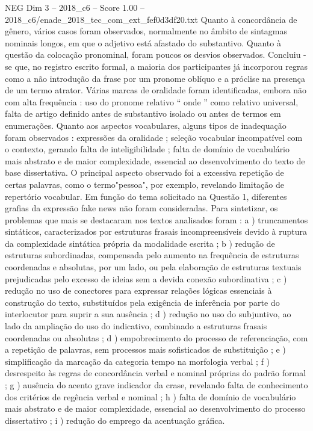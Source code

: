 \begin{textsample}{NEG Dim 3 – 2018\_c6 – Score 1.00 – 2018\_c6/enade\_2018\_tec\_com\_ext\_fef0d3df20.txt}
Quanto à concordância de gênero, vários casos foram observados, normalmente no âmbito de sintagmas nominais longos, em que o adjetivo está afastado do substantivo.
Quanto à questão da colocação pronominal, foram poucos os desvios observados.
Concluiu -se que, no registro escrito formal, a maioria dos participantes já incorporou regras como a não introdução da frase por um pronome oblíquo e a próclise na presença de um termo atrator.
Várias marcas de oralidade foram identificadas, embora não com alta frequência : uso do pronome relativo “ onde ” como relativo universal, falta de artigo definido antes de substantivo isolado ou antes de termos em enumerações.
Quanto aos aspectos vocabulares, alguns tipos de inadequação foram observados : expressões da oralidade ; seleção vocabular incompatível com o contexto, gerando falta de inteligibilidade ; falta de domínio de vocabulário mais abstrato e de maior complexidade, essencial ao desenvolvimento do texto de base dissertativa.
O principal aspecto observado foi a excessiva repetição de certas palavras, como o termo"pessoa", por exemplo, revelando limitação de repertório vocabular.
Em função do tema solicitado na Questão 1, diferentes grafias da expressão fake news não foram consideradas.
Para sintetizar, os problemas que mais se destacaram nos textos analisados foram : a ) truncamentos sintáticos, caracterizados por estruturas frasais incompreensíveis devido à ruptura da complexidade sintática própria da modalidade escrita ; b ) redução de estruturas subordinadas, compensada pelo aumento na frequência de estruturas coordenadas e absolutas, por um lado, ou pela elaboração de estruturas textuais prejudicadas pelo excesso de ideias sem a devida conexão subordinativa ; c ) redução no uso de conectores para expressar relações lógicas essenciais à construção do texto, substituídos pela exigência de inferência por parte do interlocutor para suprir a sua ausência ; d ) redução no uso do subjuntivo, ao lado da ampliação do uso do indicativo, combinado a estruturas frasais coordenadas ou absolutas ; d ) empobrecimento do processo de referenciação, com a repetição de palavras, sem processos mais sofisticados de substituição ; e ) simplificação da marcação da categoria tempo na morfologia verbal ; f ) desrespeito às regras de concordância verbal e nominal próprias do padrão formal ; g ) ausência do acento grave indicador da crase, revelando falta de conhecimento dos critérios de regência verbal e nominal ; h ) falta de domínio de vocabulário mais abstrato e de maior complexidade, essencial ao desenvolvimento do processo dissertativo ; i ) redução do emprego da acentuação gráfica.

\end{textsample}
